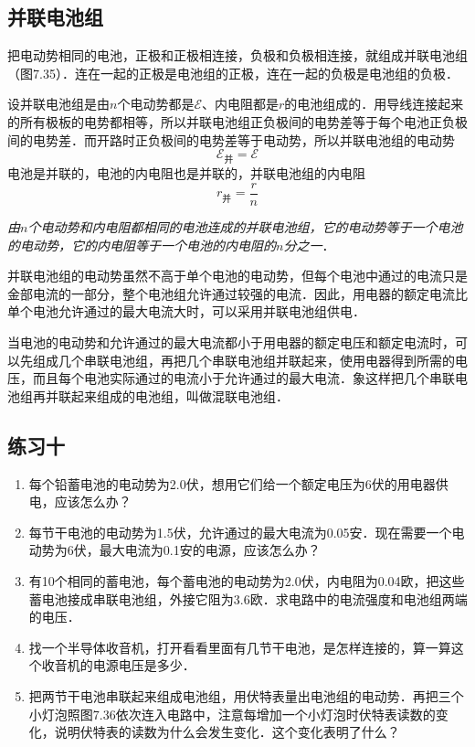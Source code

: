 \subsection{并联电池组}


把电动势相同的电池，正极和正极相连接，负极和负极相连接，就组成并联电池组（图7.35）．连在一起的正极是电池组的正极，连在一起的负极是电池组的负极．

设并联电池组是由$n$个电动势都是$\mathcal{E}$、内电阻都是$r$的电池组成的．用导线连接起来的所有极板的电势都相等，所以并联电池组正负极间的电势差等于每个电池正负极间的电势差．而开路时正负极间的电势差等于电动势，所以并联电池组的电动势
\[\mathcal{E}_{\text{并}}=\mathcal{E} \]
电池是并联的，电池的内电阻也是并联的，并联电池组的内电阻
\[r_{\text{并}}=\frac{r}{n} \]

\textit{由$n$个电动势和内电阻都相同的电池连成的并联电池组，它的电动势等于一个电池的电动势，它的内电阻等于一个电池的内电阻的$n$分之一}．

并联电池组的电动势虽然不高于单个电池的电动势，但每个电池中通过的电流只是金部电流的一部分，整个电池组允许通过较强的电流．因此，用电器的额定电流比单个电池允许通过的最大电流大时，可以采用并联电池组供电．

当电池的电动势和允许通过的最大电流都小于用电器的额定电压和额定电流时，可以先组成几个串联电池组，再把几个串联电池组并联起来，使用电器得到所需的电压，而且每个电池实际通过的电流小于允许通过的最大电流．象这样把几个串联电池组再并联起来组成的电池组，叫做混联电池组．


\subsection*{练习十}
\begin{enumerate}
    \item 每个铅蓄电池的电动势为2.0伏，想用它们给一个额定电压为6伏的用电器供电，应该怎么办？
    \item 每节干电池的电动势为1.5伏，允许通过的最大电流为0.05安．现在需要一个电动势为6伏，最大电流为0.1安的电源，应该怎么办？
    \item 有10个相同的蓄电池，每个蓄电池的电动势为2.0伏，内电阻为0.04欧，把这些蓄电池接成串联电池组，外接它阻为3.6欧．求电路中的电流强度和电池组两端的电压．
    \item 找一个半导体收音机，打开看看里面有几节干电池，是怎样连接的，算一算这个收音机的电源电压是多少．
    \item 把两节干电池串联起来组成电池组，用伏特表量出电池组的电动势．再把三个小灯泡照图7.36依次连入电路中，注意每增加一个小灯泡时伏特表读数的变化，说明伏特表的读数为什么会发生变化．这个变化表明了什么？
\end{enumerate}

